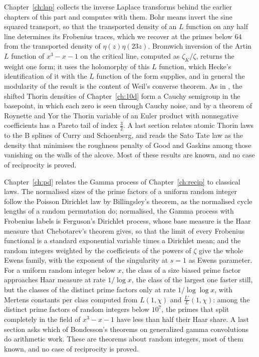Chapter~\ref{ch:lap} collects the inverse Laplace transforms behind the earlier chapters of this part and computes with them. Bohr means invert the sine squared transport, so that the transported density of an $L$ function on any half line determines its Frobenius traces, which we recover at the primes below $64$ from the transported density of $\eta(z)\eta(23z)$. Bromwich inversion of the Artin $L$ function of $x^3-x-1$ on the critical line, computed as $\zeta_K/\zeta$, returns the weight one form; it uses the holomorphy of this $L$ function, which Hecke's identification of it with the $L$ function of the form supplies, and in general the modularity of the result is the content of Weil's converse theorem. As in \cite{polson2017}, the shifted Thorin densities of Chapter~\ref{ch:10d} form a Cauchy semigroup in the basepoint, in which each zero is seen through Cauchy noise, and by a theorem of Roynette and Yor \cite{roynetteyor2005} the Thorin variable of an Euler product with nonnegative coefficients has a Pareto tail of index $\frac32$. A last section relates atomic Thorin laws to the B splines of Curry and Schoenberg, and reads the Sato Tate law as the density that minimises the roughness penalty of Good and Gaskins among those vanishing on the walls of the alcove. Most of these results are known, and no case of reciprocity is proved.

Chapter~\ref{ch:pd} relates the Gamma process of Chapter~\ref{ch:recip} to classical laws. The normalised sizes of the prime factors of a uniform random integer follow the Poisson Dirichlet law by Billingsley's theorem, as the normalised cycle lengths of a random permutation do; normalised, the Gamma process with Frobenius labels is Ferguson's Dirichlet process, whose base measure is the Haar measure that Chebotarev's theorem gives, so that the limit of every Frobenius functional is a standard exponential variable times a Dirichlet mean; and the random integers weighted by the coefficients of the powers of $\zeta$ give the whole Ewens family, with the exponent of the singularity at $s=1$ as Ewens parameter. For a uniform random integer below $x$, the class of a size biased prime factor approaches Haar measure at rate $1/\log x$, the class of the largest one faster still, but the classes of the distinct prime factors only at rate $1/\log\log x$, with Mertens constants per class computed from $L(1,\chi)$ and $\frac{L'}L(1,\chi)$: among the distinct prime factors of random integers below $10^7$, the primes that split completely in the field of $x^3-x-1$ have less than half their Haar share. A last section asks which of Bondesson's theorems on generalized gamma convolutions do arithmetic work. These are theorems about random integers, most of them known, and no case of reciprocity is proved.

